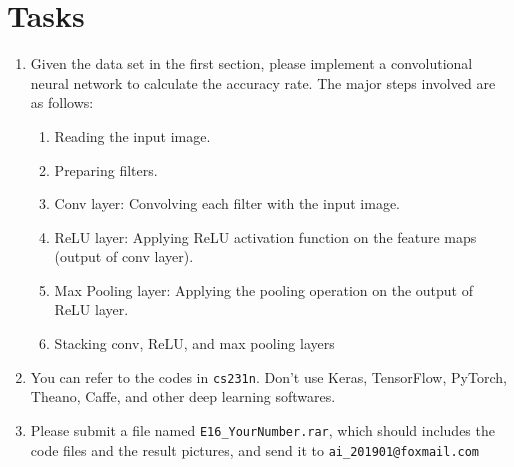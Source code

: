 \documentclass[a4paper, 11pt]{article}
\begin{document}
\section{Tasks}
\begin{enumerate}
	\item Given the data set in the first section, please implement a convolutional neural network to calculate the accuracy rate. The major steps involved are as follows:
	\begin{enumerate}
		\item Reading the input image.
		\item Preparing filters.
		\item Conv layer: Convolving each filter with the input image.
		\item ReLU layer: Applying ReLU activation function on the feature maps (output of conv layer).
		\item Max Pooling layer: Applying the pooling operation on the output of ReLU layer.
		\item Stacking conv, ReLU, and max pooling layers
	\end{enumerate}
	\item You can refer to the codes in \texttt{cs231n}. Don't use Keras, TensorFlow, PyTorch, Theano, Caffe, and other deep learning softwares.
	\item Please submit a file named \texttt{E16\_YourNumber.rar}, which should includes the code files and the result pictures, and send it to \texttt{ai\_201901@foxmail.com}
\end{enumerate}
\end{document}
